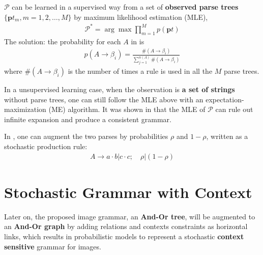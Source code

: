 \documentclass[../Notes_of_CaRiVaC.tex]{subfiles}
\begin{document}
$\mathcal{P}$ can be learned in a supervised way from a set of
\textbf{observed parse trees} $\{\mathbf{p} t_m, m = 1, 2, \ldots, M\}$ by
maximum likelihood estimation (MLE),
%
\begin{align}
  \label{eq:ii.1.12}
  \tag{1.12}
  \mathcal{P^*} = \arg \max \prod^M_{m=1} p(\mathbf{p}t)
\end{align}
%
The solution: the probability for each $A$ in  is
%
\begin{align}
  \label{eq:ii.1.13}
  \tag{1.13}
  p(A \to \beta_i) = \frac{\#(A \to \beta_i)}{\sum^{n(A)}_{j=1} \#(A \to \beta_i)}
\end{align}
%
where $\#(A \to \beta_i)$ is the number of times a rule is used in all the $M$
parse trees.

In a unsupervised learning case, when the observation is
\textbf{a set of strings} without parse trees, one can still follow the MLE
above with an expectation-maximization (ME) algorithm. It was shown
in\cite{chi1998} that the MLE of $\mathcal{P}$ can rule out infinite expansion
and produce a consistent grammar.

In , one can augment the two parses by probabilities $\rho$ and
$1 - \rho$, written as a stochastic production rule:
%
\begin{align}
  \label{eq:ii.1.14}
  \tag{1.14}
  A \to a \cdot b \vert c \cdot c; \quad \rho \vert (1 - \rho)
\end{align}
%

\section{Stochastic Grammar with Context}%
\label{sec:ii.1.5}
Later on, the proposed image grammar, an \textbf{And-Or tree}, will be
augmented to an \textbf{And-Or graph} by adding relations and contexts
constraints as horizontal links, which results in probabilistic models to
represent a stochastic \textbf{context sensitive} grammar for images.

%
\end{document}
